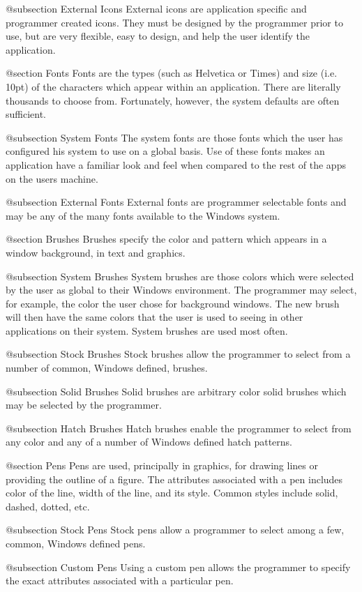 @subsection External Icons
External icons are application specific and programmer created icons.
They must be designed by the programmer prior to use, but are very
flexible, easy to design, and help the user identify the application.

@section Fonts
Fonts are the types (such as Helvetica or Times) and size (i.e. 10pt)
of the characters which appear within an application.  There are
literally thousands to choose from.  Fortunately, however, the system
defaults are often sufficient.

@subsection System Fonts
The system fonts are those fonts which the user has configured his
system to use on a global basis.  Use of these fonts makes an
application have a familiar look and feel when compared to the rest of
the apps on the users machine.

@subsection External Fonts
External fonts are programmer selectable fonts and may be any of the
many fonts available to the Windows system.

@section Brushes
Brushes specify the color and pattern which appears in a window background,
in text and graphics.

@subsection System Brushes
System brushes are those colors which were selected by the user as
global to their Windows environment.  The programmer may select, for
example, the color the user chose for background windows.  The
new brush will then have the same colors that the user is used
to seeing in other applications on their system.  System brushes are
used most often.

@subsection Stock Brushes
Stock brushes allow the programmer to select from a number of common,
Windows defined, brushes.

@subsection Solid Brushes
Solid brushes are arbitrary color solid brushes which may be selected
by the programmer.

@subsection Hatch Brushes
Hatch brushes enable the programmer to select from any color and any of
a number of Windows defined hatch patterns.

@section Pens
Pens are used, principally in graphics, for drawing lines or providing
the outline of a figure.  The attributes associated with a pen includes
color of the line, width of the line, and its style.  Common styles
include solid, dashed, dotted, etc.

@subsection Stock Pens
Stock pens allow a programmer to select among a few, common, Windows
defined pens.

@subsection Custom Pens
Using a custom pen allows the programmer to specify the exact attributes
associated with a particular pen.

